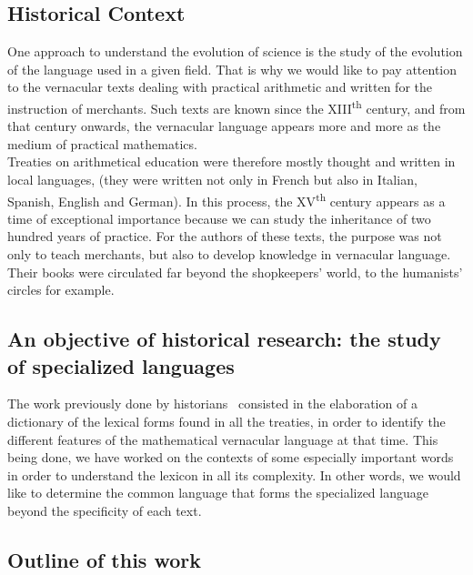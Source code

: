 \documentclass[preprint]{elsarticle}
\begin{document}
\subsection*{Historical Context}

One approach to understand the evolution of science is the study of the evolution of the language used in a given field. That is why we would like to pay attention to the vernacular texts dealing with practical arithmetic and written for the instruction of merchants. Such texts are known since the XIII\textsuperscript{th} century, and from that century onwards,  the vernacular language appears more and more as the medium of practical mathematics.\\

Treaties on arithmetical education were therefore mostly thought and written in local languages, (they  were written not only in French but also in Italian, Spanish, English and German). In this process, the XV\textsuperscript{th} century appears as a time of exceptional importance because we can study the inheritance of two hundred years of practice. For the authors of these texts, the purpose was not only to teach merchants, but also to develop knowledge in vernacular language. Their books were circulated far beyond the shopkeepers' world, to the humanists' circles for example.\\

\subsection*{An objective of historical research: the study of specialized languages}

The work previously done by historians~\cite{lamasse2012} consisted in the elaboration of a dictionary of the lexical forms found in all the treaties, in order to identify the different features of the mathematical vernacular language at that time. This being done, we have worked on the contexts of some especially important words in order to understand the lexicon in all its complexity. In other words, we would like to determine the common language that forms the specialized language beyond the specificity of each text.

\subsection*{Outline of this work}
\end{document}
